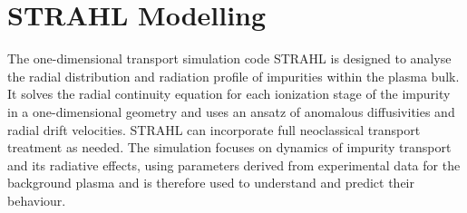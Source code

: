     \section{STRAHL Modelling}\label{sec:strahlmodel}%
%
            The one-dimensional transport simulation code STRAHL is designed to analyse the radial distribution and radiation profile of impurities within the plasma bulk. It solves the radial continuity equation for each ionization stage of the impurity in a one-dimensional geometry and uses an ansatz of anomalous diffusivities and radial drift velocities. STRAHL can incorporate full neoclassical transport treatment as needed. The simulation focuses on dynamics of impurity transport and its radiative effects, using parameters derived from experimental data for the background plasma and is therefore used to understand and predict their behaviour.%
%
